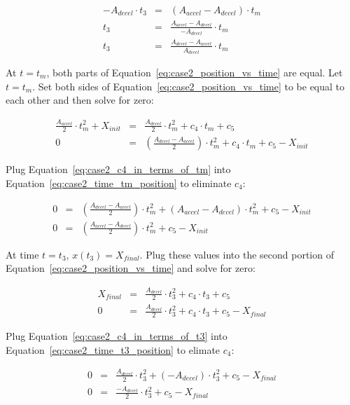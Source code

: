 \documentclass[11pt]{article} %
\begin{document}
\begin{eqnarray}
-A_{decel} \cdot t_3 & = & (A_{accel} - A_{decel}) \cdot t_m \nonumber \\
t_3 & = & \frac{A_{accel} - A_{decel}}{-A_{decel}} \cdot t_m \nonumber \\
t_3 & = & \frac{A_{decel} - A_{accel}}{A_{decel}} \cdot t_m \label{eq:case2_t3_in_terms_of_tm}
\end{eqnarray}

\noindent At $t=t_m$, both parts of Equation~\ref{eq:case2_position_vs_time} are equal. Let $t=t_m$. Set both sides of Equation~\ref{eq:case2_position_vs_time} to be equal to each other and then solve for zero:

\begin{eqnarray}
\frac{A_{accel}}{2}  \cdot t_m^2 + X_{init} & = & \frac{A_{decel}}{2}  \cdot t_m^2 + c_4 \cdot t_m + c_5 \nonumber \\
0 & = & \left( \frac{A_{decel} - A_{accel}}{2} \right)  \cdot t_m^2 + c_4 \cdot t_m + c_5 - X_{init} \label{eq:case2_time_tm_position}
\end{eqnarray}

\noindent Plug Equation~\ref{eq:case2_c4_in_terms_of_tm} into Equation~\ref{eq:case2_time_tm_position}  to eliminate $c_4$:

\begin{eqnarray}
0  & = & \left( \frac{A_{decel} - A_{accel}}{2} \right)  \cdot t_m^2 + (A_{accel} - A_{decel}) \cdot t^2_m + c_5 - X_{init} \nonumber \\
0 & = &  \left( \frac{A_{accel} - A_{decel}}{2} \right)  \cdot t_m^2 + c_5 - X_{init} \label{eq:case2_time_tm_position2}
\end{eqnarray}

\noindent At time $t=t_3$, $x(t_3) = X_{final}$. Plug these values into the second portion of Equation~\ref{eq:case2_position_vs_time} and solve for zero:

\begin{eqnarray}
X_{final} & = & \frac{A_{decel}}{2}  \cdot t_3^2 + c_4 \cdot t_3 + c_5 \nonumber \\
0 & = &  \frac{A_{decel}}{2}  \cdot t_3^2 + c_4 \cdot t_3 + c_5 - X_{final} \label{eq:case2_time_t3_position}
\end{eqnarray}

\noindent Plug Equation~\ref{eq:case2_c4_in_terms_of_t3} into Equation~\ref{eq:case2_time_t3_position} to elimate $c_4$:

\begin{eqnarray}
0 & = &  \frac{A_{decel}}{2}  \cdot t_3^2 + (-A_{decel}) \cdot t^2_3 + c_5 - X_{final} \nonumber \\
0 & = &  \frac{-A_{decel}}{2}  \cdot t_3^2 + c_5 - X_{final} \label{eq:case2_time_t3_position2}
\end{eqnarray}
\end{document}
